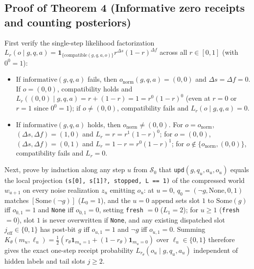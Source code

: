 \documentclass[11pt,letterpaper]{article}
\providecommand{\tightlist}{\setlength{\itemsep}{2pt}\setlength{\parskip}{0pt}}
\begin{document}
\subsection{Proof of Theorem 4 (Informative zero receipts and counting
posteriors)}\label{proof-of-theorem-4-informative-zero-receipts-and-counting-posteriors}

First verify the single-step likelihood factorization
\(L_r(o \mid g, q, a) = \mathbf{1}_{\{\mathrm{compatible}(g,q,a,o)\}} r^{\Delta s}(1-r)^{\Delta f}\)
across all \(r \in [0,1]\) (with \(0^0 = 1\)):

\begin{itemize}
\tightlist
\item
  If \(\mathrm{informative}(g, q, a)\) fails, then
  \(o_{\mathrm{norm}}(g, q, a) = (0,0)\) and
  \(\Delta s = \Delta f = 0\). If \(o = (0,0)\), compatibility holds and
  \(L_r((0,0) \mid g, q, a) = r + (1 - r) = 1 = r^0 (1 - r)^0\) (even at
  \(r = 0\) or \(r = 1\) since \(0^0 = 1\)); if \(o \neq (0,0)\),
  compatibility fails and \(L_r(o \mid g, q, a) = 0\).
\item
  If \(\mathrm{informative}(g, q, a)\) holds, then
  \(o_{\mathrm{norm}} \neq (0,0)\). For \(o = o_{\mathrm{norm}}\),
  \((\Delta s, \Delta f) = (1, 0)\) and \(L_r = r = r^1 (1 - r)^0\); for
  \(o = (0,0)\), \((\Delta s, \Delta f) = (0, 1)\) and
  \(L_r = 1 - r = r^0 (1 - r)^1\); for
  \(o \notin \{o_{\mathrm{norm}}, (0,0)\}\), compatibility fails and
  \(L_r = 0\).
\end{itemize}

Next, prove by induction along any step \(u\) from \(\mathcal{S}_0\)
that \texttt{upd}\((g, q_u, a_u, o_u)\) equals the local projection
\texttt{(s{[}0{]},\ s{[}1{]}?,\ stopped,\ L\ ==\ 1)} of the compressed
world \(w_{u+1}\) on every noise realization \(z_u\) emitting \(o_u\):
at \(u = 0\), \(q_0 = (\neg g, \mathrm{None}, 0, 1)\) matches
\([\mathrm{Some}(\neg g)]\) (\(L_0 = 1\)), and the \(u=0\) append sets
slot \(1\) to \(\mathrm{Some}(g)\) iff \(o_{0,1} = 1\) and \texttt{None}
iff \(o_{0,1} = 0\), setting \texttt{fresh} \(= 0\) (\(L_1 = 2\)); for
\(u \ge 1\) (\texttt{fresh} \(= 0\)), slot \(1\) is never overwritten if
\texttt{None}, and any existing dispatched slot
\(j_{\mathrm{eff}} \in \{0,1\}\) has post-bit \(g\) iff \(o_{u,1} = 1\)
and \(\neg g\) iff \(o_{u,1} = 0\). Summing
\(K_\theta(m_u, \ell_u) = \frac{1}{2}(r_\theta \mathbf{1}_{m_u=1} + (1-r_\theta)\mathbf{1}_{m_u=0})\)
over \(\ell_u \in \{0,1\}\) therefore gives the exact one-step receipt
probability \(L_{r_\theta}(o_u \mid g, q_u, a_u)\) independent of hidden
labels and tail slots \(j \ge 2\).
\end{document}
